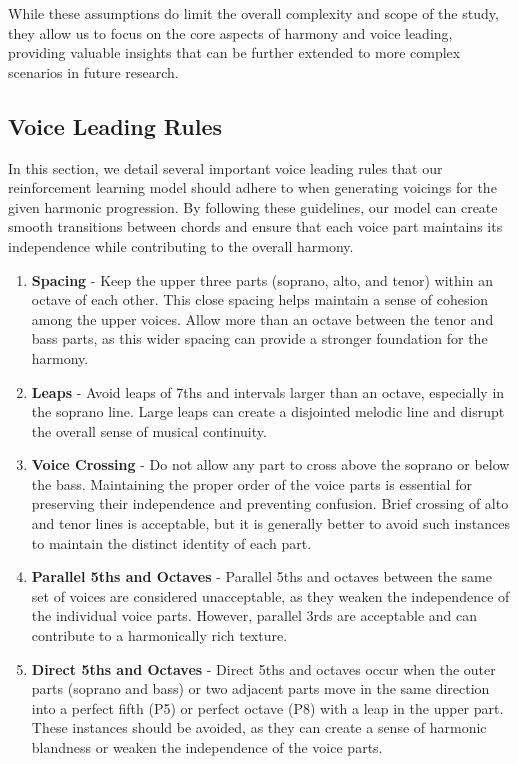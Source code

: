 \documentclass[12pt, letterpaper]{article}
\begin{document}
While these assumptions do limit the overall complexity and scope of the study, they allow us to focus on the core aspects of harmony and voice leading, providing valuable insights that can be further extended to more complex scenarios in future research.

\subsection{Voice Leading Rules}

In this section, we detail several important voice leading rules that our reinforcement learning model should adhere to when generating voicings for the given harmonic progression. By following these guidelines, our model can create smooth transitions between chords and ensure that each voice part maintains its independence while contributing to the overall harmony.

\begin{enumerate}
    \item \textbf{Spacing} - Keep the upper three parts (soprano, alto, and tenor) within an octave of each other. This close spacing helps maintain a sense of cohesion among the upper voices. Allow more than an octave between the tenor and bass parts, as this wider spacing can provide a stronger foundation for the harmony.
    \item \textbf{Leaps} - Avoid leaps of 7ths and intervals larger than an octave, especially in the soprano line. Large leaps can create a disjointed melodic line and disrupt the overall sense of musical continuity.
    \item \textbf{Voice Crossing} - Do not allow any part to cross above the soprano or below the bass. Maintaining the proper order of the voice parts is essential for preserving their independence and preventing confusion. Brief crossing of alto and tenor lines is acceptable, but it is generally better to avoid such instances to maintain the distinct identity of each part.
    \item \textbf{Parallel 5ths and Octaves} - Parallel 5ths and octaves between the same set of voices are considered unacceptable, as they weaken the independence of the individual voice parts. However, parallel 3rds are acceptable and can contribute to a harmonically rich texture.
    \item \textbf{Direct 5ths and Octaves} - Direct 5ths and octaves occur when the outer parts (soprano and bass) or two adjacent parts move in the same direction into a perfect fifth (P5) or perfect octave (P8) with a leap in the upper part. These instances should be avoided, as they can create a sense of harmonic blandness or weaken the independence of the voice parts.
\end{enumerate}
\end{document}
